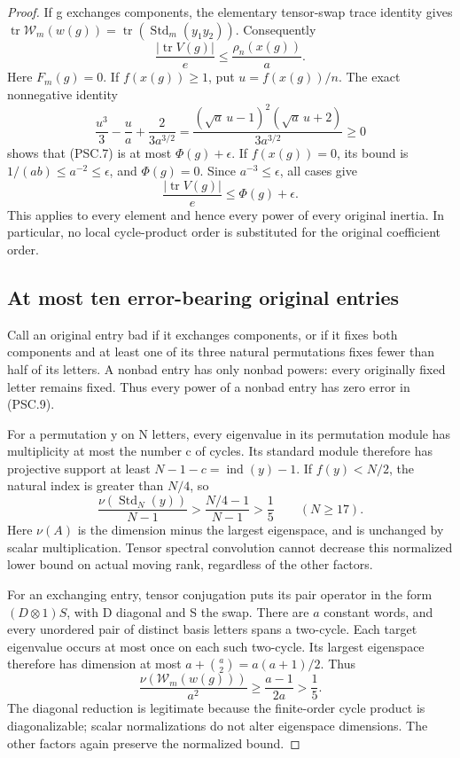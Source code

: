 \begin{proof}
If g exchanges components, the elementary tensor-swap trace
identity gives
\(\operatorname{tr}\mathcal W_m(w(g))
 =\operatorname{tr}(\operatorname{Std}_m(y_1y_2))\).
Consequently
\[
                   \frac{|\operatorname{tr}V(g)|}{e}
                     \le\frac{\rho_n(x(g))}{a}.
 \tag{PSC.7}
\]
Here \(F_m(g)=0\).  If \(f(x(g))\ge1\), put
\(u=f(x(g))/n\).  The exact nonnegative identity
\[
 \frac{u^3}{3}-\frac{u}{a}+\frac{2}{3a^{3/2}}
     =\frac{(\sqrt a\,u-1)^2(\sqrt a\,u+2)}{3a^{3/2}}
     \ge0
 \tag{PSC.8}
\]
shows that (PSC.7) is at most \(\Phi(g)+\epsilon\).
If \(f(x(g))=0\), its bound is \(1/(ab)\le a^{-2}\le\epsilon\),
and \(\Phi(g)=0\).  Since \(a^{-3}\le\epsilon\), all cases give
\[
                       \frac{|\operatorname{tr}V(g)|}{e}
                               \le\Phi(g)+\epsilon.
 \tag{PSC.9}
\]
This applies to every element and hence every power of every
original inertia.  In particular, no local cycle-product order
is substituted for the original coefficient order.

\subsection*{At most ten error-bearing original entries}

Call an original entry bad if it exchanges components, or if
it fixes both components and at least one of its three natural
permutations fixes fewer than half of its letters.  A nonbad
entry has only nonbad powers: every originally fixed letter
remains fixed.  Thus every power of a nonbad entry has zero
error in (PSC.9).

For a permutation y on N letters, every eigenvalue in its
permutation module has multiplicity at most the number c of
cycles.  Its standard module therefore has projective support
at least \(N-1-c=\operatorname{ind}(y)-1\).
If \(f(y)<N/2\), the natural index is greater than \(N/4\),
so
\[
 \frac{\nu(\operatorname{Std}_N(y))}{N-1}
       >\frac{N/4-1}{N-1}>\frac15
                              \qquad(N\ge17).
 \tag{PSC.10}
\]
Here \(\nu(A)\) is the dimension minus the largest eigenspace,
and is unchanged by scalar multiplication.  Tensor spectral
convolution cannot decrease this normalized lower bound on
actual moving rank, regardless of the other factors.

For an exchanging entry, tensor conjugation puts its pair
operator in the form \((D\otimes1)S\), with D diagonal and
S the swap.  There are \(a\) constant words, and every unordered
pair of distinct basis letters spans a two-cycle.  Each target
eigenvalue occurs at most once on each such two-cycle.  Its
largest eigenspace therefore has dimension at most
\(a+\binom a2=a(a+1)/2\).  Thus
\[
  \frac{\nu(\mathcal W_m(w(g)))}{a^2}
                 \ge\frac{a-1}{2a}>\frac15.
 \tag{PSC.11}
\]
The diagonal reduction is legitimate because the finite-order
cycle product is diagonalizable; scalar normalizations do not
alter eigenspace dimensions.  The other factors again preserve
the normalized bound.


\end{proof}
